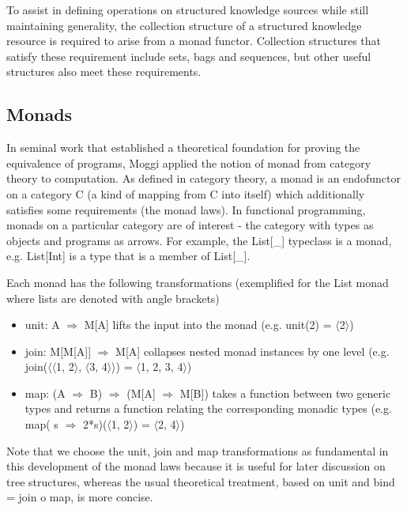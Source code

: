 \documentclass[runningheads]{llncs}
\begin{document}
To assist in defining operations on structured knowledge sources while still maintaining generality, the collection structure of a structured knowledge resource is required to arise from a monad functor. Collection structures that satisfy these requirement include sets, bags and sequences, but other useful structures also meet these requirements.

\subsection{Monads}
In seminal work that established a theoretical foundation for proving the equivalence of programs, Moggi applied the notion of monad from category theory to computation.
As defined in category theory, a monad  is an endofunctor on a category C (a kind of mapping from C into itself) which additionally satisfies some requirements (the monad laws).
In functional programming, monads on a particular category are of interest - the category with types as objects and programs as arrows.
For example, the List[\_] typeclass is a monad, e.g. List[Int] is a type that is a member of List[\_].

Each monad has the following transformations (exemplified for the List monad where lists are denoted with angle brackets)
\begin{itemize}
\item unit: A $\Rightarrow$ M[A] lifts the input into the monad (e.g. unit(2) = $\langle$2$\rangle$)
\item join: M[M[A]] $\Rightarrow$ M[A] collapses nested monad instances by one level (e.g. join($\langle$$\langle$1, 2$\rangle$, $\langle$3, 4$\rangle$$\rangle$) = $\langle$1, 2, 3, 4$\rangle$)
\item map: (A $\Rightarrow$ B) $\Rightarrow$ (M[A] $\Rightarrow$ M[B]) takes a function between two generic types and returns a function relating the corresponding monadic types (e.g. map( s $\Rightarrow$ 2*s)($\langle$1, 2$\rangle$) = $\langle$2, 4$\rangle$)
\end{itemize}
Note that we choose the unit, join and map transformations\cite{Wadler1992} as fundamental in this development of the monad laws because it is useful for later discussion on tree structures, whereas the usual theoretical treatment, based on unit and bind = join o map, is more concise.
\end{document}
